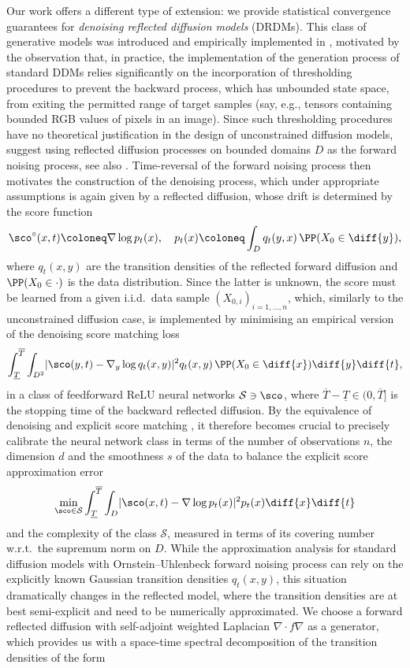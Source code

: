 \documentclass[a4paper, 11pt, headings = small, abstract]{scrartcl}
\begin{document}
Our work offers a different type of extension: we provide statistical convergence guarantees for \textit{denoising reflected diffusion models} (DRDMs). This class of generative models was introduced and empirically implemented in \cite{lou23}, motivated by the observation that, in practice, the implementation of the generation process of standard DDMs relies significantly on the incorporation of thresholding procedures to prevent the backward process, which has unbounded state space, from exiting the permitted range of target samples (say, e.g., tensors containing bounded RGB values of pixels in an image). Since such thresholding procedures have no theoretical justification in the design of unconstrained diffusion models, \cite{lou23} suggest using reflected diffusion processes on bounded domains $D$ as the forward noising process, see also \cite{fishman23,fishman23b}. 
Time-reversal of the forward noising process then motivates the construction of the denoising process, which under appropriate assumptions is again given by a reflected diffusion, whose drift is determined by the score function 
\[\sco^\circ(x,t) \coloneq \nabla \log p_t(x), \quad p_t(x) \coloneq \int_D q_t(y,x)\, \PP(X_0 \in \diff{y}),\]
where $q_t(x,y)$ are the transition densities of the reflected forward diffusion and $\PP(X_0 \in \cdot)$ is the data distribution. Since the latter is unknown,  the score must be learned from a given i.i.d.\ data sample $(X_{0,i})_{i = 1,\ldots,n}$, which, similarly to the unconstrained diffusion case, is implemented by minimising an empirical version of the denoising score matching loss 
\[\int_{\underline{T}}^{\overline{T}} \int_{D^2} \lvert \sco(y,t) - \nabla_y \log q_t(x,y) \rvert^2 q_t(x,y) \,\PP(X_0 \in \diff{x}) \diff{y} \diff{t},\]
in a class of feedforward ReLU neural networks $\mathcal{S} \ni \sco$, where $\overline{T} - \underline{T} \in (0, \overline{T}]$ is the  stopping time of the backward reflected diffusion. By the equivalence of denoising and explicit score matching \cite{vincent11}, it therefore becomes crucial to precisely calibrate the neural network class in terms of the number of observations $n$, the dimension $d$ and the smoothness $s$ of the data to balance the explicit score approximation error
\[\min_{\sco \in \mathcal{S}} \int_{\underline{T}}^{\overline{T}} \int_D \lvert\sco(x,t) - \nabla \log p_t(x) \rvert^2 p_t(x) \diff{x} \diff{t}\]
and the complexity of the class $\mathcal{S}$, measured in terms of its covering number w.r.t.\ the supremum norm on $D$. 
While the approximation analysis for standard diffusion models with Ornstein--Uhlenbeck forward noising process \cite{oko23,chen23b,tang24,azangulov24} can rely on the explicitly known Gaussian transition densities $q_t(x,y)$, this situation dramatically changes in the reflected model, where the transition densities are at best semi-explicit and need to be numerically approximated. We choose a forward reflected diffusion with self-adjoint weighted Laplacian $\nabla \cdot f\nabla$ as a generator, which provides us with a space-time spectral decomposition of the transition densities of the form
\end{document}
